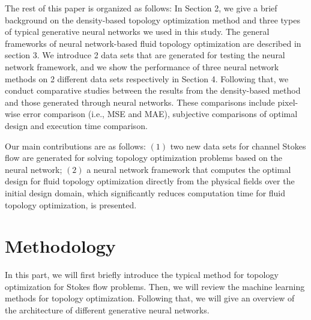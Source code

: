 \documentclass{article}
\begin{document}
The rest of this paper is organized as follows: In Section 2, we give a brief background on the density-based topology optimization method and three types of typical generative neural networks we used in this study. The general frameworks of neural network-based fluid topology optimization are described in section 3. We introduce 2 data sets that are generated for testing the neural network framework, and we show the performance of three neural network methods on 2 different data sets respectively in Section 4. Following that, we conduct comparative studies between the results from the density-based method and those generated through neural networks. These comparisons include pixel-wise error comparison (i.e., MSE and MAE),  subjective comparisons of optimal design and execution time comparison.

Our main contributions are as follows:  $(1)$ two new data sets for channel Stokes flow are generated for solving topology optimization problems based on the neural network; $(2)$ a neural network framework that computes the optimal design for fluid topology optimization directly from the physical fields over the initial design domain, which significantly reduces computation time for fluid topology optimization, is presented. 
\section{Methodology}
In this part, we will first briefly introduce the typical method for topology optimization for Stokes flow problems. Then, we will review the machine learning methods for topology optimization. Following that,  we will give an overview of the architecture of different generative neural networks.
\end{document}
